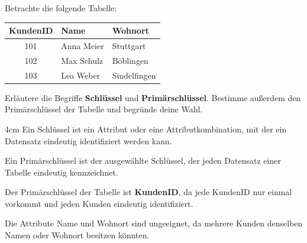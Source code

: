 \question[4]
Betrachte die folgende Tabelle:

\begin{center}
\begin{tabular}{|c|l|l|}
\hline
KundenID & Name & Wohnort \\
\hline
101 & Anna Meier & Stuttgart \\
102 & Max Schulz & Böblingen \\
103 & Lea Weber & Sindelfingen \\
\hline
\end{tabular}
\end{center}

Erläutere die Begriffe \textbf{Schlüssel} und \textbf{Primärschlüssel}.
Bestimme außerdem den Primärschlüssel der Tabelle und begründe deine Wahl.

\begin{solutionbox}{4cm}
Ein Schlüssel ist ein Attribut oder eine Attributkombination, mit der ein Datensatz eindeutig identifiziert werden kann.

Ein Primärschlüssel ist der ausgewählte Schlüssel, der jeden Datensatz einer Tabelle eindeutig kennzeichnet.

Der Primärschlüssel der Tabelle ist \textbf{KundenID}, da jede KundenID nur einmal vorkommt und jeden Kunden eindeutig identifiziert.

Die Attribute Name und Wohnort sind ungeeignet, da mehrere Kunden denselben Namen oder Wohnort besitzen könnten.
\end{solutionbox}